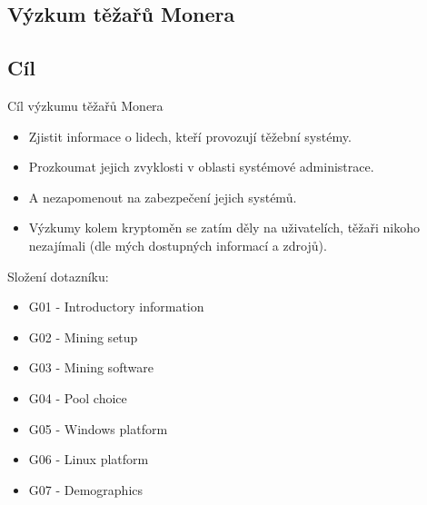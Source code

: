 \documentclass{beamer}
\begin{document}
  \begin{darkframes}
    \section{Výzkum těžařů Monera}
    \subsection{Cíl}
    \begin{frame}{Cíl výzkumu těžařů Monera}
\begin{itemize}
\item Zjistit informace o lidech, kteří provozují těžební systémy. 
\item Prozkoumat jejich zvyklosti v oblasti systémové administrace.
\item A nezapomenout na zabezpečení jejich systémů.
\end{itemize}
\vspace{0.7em}
\begin{itemize}
\item Výzkumy kolem kryptoměn se zatím děly na uživatelích, těžaři nikoho nezajímali (dle mých dostupných informací a zdrojů).
\end{itemize}
\vspace{0.7em}
Složení dotazníku:
\begin{itemize}
\item<1-4> G01 - Introductory information
\item<1-4> G02 - Mining setup
\item<1-4> G03 - Mining software
\item<2-4> G04 - Pool choice
\item<3-4> G05 - Windows platform
\item<3-4> G06 - Linux platform
\item<4-4> G07 - Demographics
\end{itemize}
    \end{frame}

\end{darkframes}
\end{document}
